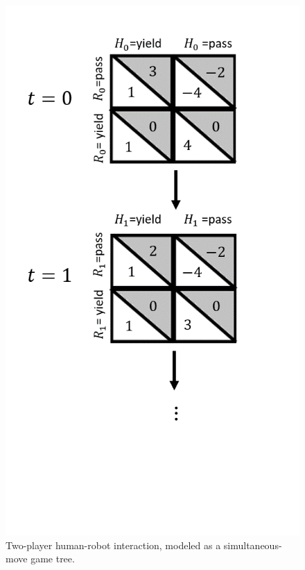 \documentclass[letterpaper, 10 pt, conference]{ieeeconf}  %
\begin{document}
\begin{figure}[t]
	\centering
	\includegraphics[scale=0.4]{newGameTree}
	\vspace{-5em}
	\caption{Two-player human-robot interaction, modeled as a simultaneous-move game tree. }
	\vspace{-1.4em}
	\label{fig:game_tree}
\end{figure}
\end{document}
